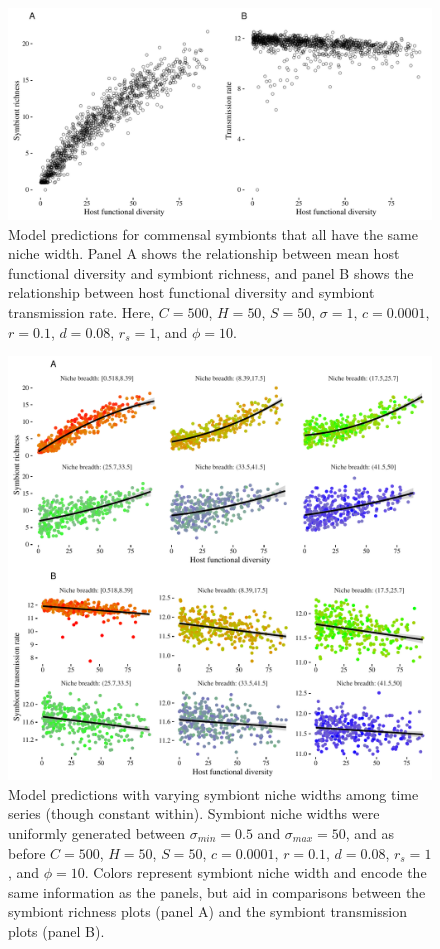 \begin{figure}[ht]\centering
\includegraphics[width=\linewidth]{figs/ch6/fig1.pdf}
\caption[Predictions when niche widths are equal]{Model predictions for commensal symbionts that all have the same niche width. Panel A shows the relationship between mean host functional diversity and symbiont richness, and panel B shows the relationship between host functional diversity and symbiont transmission rate. Here, $C=500$, $H=50$, $S=50$, $\sigma = 1$, $c=0.0001$, $r=0.1$, $d=0.08$, $r_s=1$, and $\phi = 10$.}
\label{f2}
\end{figure}

\begin{figure}[ht]\centering
\includegraphics[width=\linewidth]{figs/ch6/fig2.pdf}
\caption[Predictions when niche widths vary among communities]{Model predictions with varying symbiont niche widths among time series (though constant within). Symbiont niche widths were uniformly generated between $\sigma_{min} = 0.5$ and $\sigma_{max} = 50$, and as before $C=500$, $H=50$, $S=50$, $c=0.0001$, $r=0.1$, $d=0.08$, $r_s=1$, and $\phi = 10$. Colors represent symbiont niche width and encode the same information as the panels, but aid in comparisons between the symbiont richness plots (panel A) and the symbiont transmission plots (panel B).}
\label{f3}
\end{figure}

